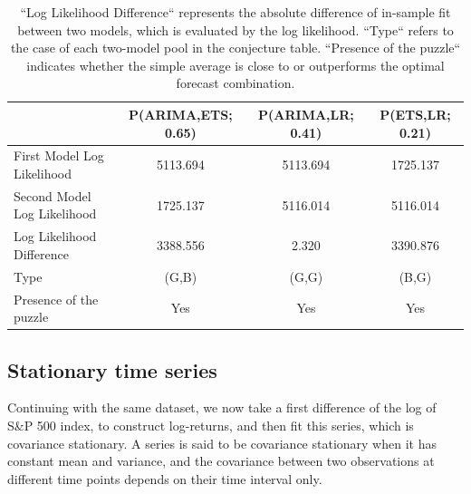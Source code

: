 \documentclass{monashthesis}
\begin{document}
\begin{table}[ht]
  \centering
    \begin{tabular}{l|ccc}
    \toprule
                                    & P(ARIMA,ETS; 0.65) & P(ARIMA,LR; 0.41) & P(ETS,LR; 0.21) \\  
    \midrule
    First Model Log Likelihood      &     5113.694       &      5113.694     &   1725.137      \\
    Second Model Log Likelihood     &     1725.137       &      5116.014     &   5116.014      \\
    Log Likelihood Difference       &     3388.556       &       2.320       &   3390.876      \\
    Type                            &       (G,B)        &       (G,G)       &     (B,G)       \\
    Presence of the puzzle          &       Yes          &        Yes        &     Yes         \\
    \bottomrule
    \end{tabular}
  \caption{``Log Likelihood Difference`` represents the absolute difference of in-sample fit between two models, which is evaluated by the log likelihood. ``Type`` refers to the case of each two-model pool in the conjecture table. ``Presence of the puzzle`` indicates whether the simple average is close to or outperforms the optimal forecast combination.}
  \label{tab:nonfit}
\end{table}

\subsection*{Stationary time series}

Continuing with the same dataset, we now take a first difference of the log of S\&P 500 index, to construct log-returns, and then fit this series, which is covariance stationary. A series is said to be covariance stationary when it has constant mean and variance, and the covariance between two observations at different time points depends on their time interval only.
\end{document}
